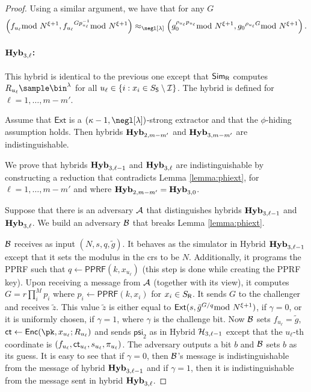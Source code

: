 \begin{proof}
Using a similar argument, we have that 
for any $G$
$$   \left (f_{u_\ell}\smod N^{\xi+1},{f_{u_\ell}}^{ G p_{u_\ell}^{-1}}\smod N^{\xi+1}\right)\approx_{\negl[\lambda]} \left( g_0^{\rho_{u_\ell} p_{u_\ell}}\smod N^{\xi+1},{ g_0}^{\rho_{u_\ell} G}\smod N^{\xi+1}\right).
$$


\paragraph{$\mathsf{\mathbf{Hyb}}_{3,\ell}$:} This hybrid is identical to the previous one except that $\mathsf{Sim}_{\mathsf{R}}$ computes $R_{u_\ell}\sample \bin^\lambda$ for all $u_\ell\in \{i:x_i\in S_{\mathsf{S}}\setminus \mathcal{I} \}$. The hybrid is defined for $\ell=1,\dots, m-m'$.

\begin{claim}
Assume that $\mathsf{Ext}$ is a $(\kappa-1,\negl[\lambda])$-strong extractor and that the $\phi$-hiding assumption holds. Then hybrids $\mathsf{\mathbf{Hyb}}_{2,m-m'}$ and $\mathsf{\mathbf{Hyb}}_{3,m-m'}$ are indistinguishable.
\end{claim}
We prove that hybrids $\mathsf{\mathbf{Hyb}}_{3,\ell-1}$ and $\mathsf{\mathbf{Hyb}}_{3,\ell}$ are indistinguishable by constructing a reduction that contradicts Lemma \ref{lemma:phiext}, for $\ell=1,\dots, m-m'$ and where $\mathsf{\mathbf{Hyb}}_{2,m-m'}=\mathsf{\mathbf{Hyb}}_{3,0}$. 

Suppose that there is an adversary $\mathcal{A}$ that distinguishes hybrids $\mathsf{\mathbf{Hyb}}_{3,\ell-1}$ and $\mathsf{\mathbf{Hyb}}_{3,\ell}$. We build an adversary $\mathcal{B}$ that breaks Lemma \ref{lemma:phiext}. 


$\mathcal{B}$ receives as input $(N,s,q,\tilde g)$. It behaves as the simulator in Hybrid $\mathsf{\mathbf{Hyb}}_{3,\ell-1}$ except that it sets the modulus in the crs to be $N$. Additionally, it programs the PPRF such that $q\leftarrow\mathsf{PPRF}(k,x_{u_\ell})$ (this step is done while creating the PPRF key). Upon receiving a message from $\mathcal{A}$ (together with its view),
 it computes $G=r\prod_i^M p_i$ where $p_i\leftarrow\mathsf{PPRF}(k,x_i)$ for $x_i\in S_{\mathsf{R}}$. It sends $G$ to the challenger and receives $\tilde z$. This value $\tilde z$ is either equal to $\mathsf{Ext}(s,\tilde g^{G/q}\!\!\!\!\mod N^{\xi+1})$, if $\gamma=0$, or it is uniformly chosen, if $\gamma=1$, where $\gamma$ is the challenge bit. Now $\mathcal{B}$ sets $f_{u_\ell}=\tilde g$, $\ct\leftarrow\mathsf{Enc}(\pk,x_{u_\ell};R_{u_\ell})$ and sends $\mathsf{psi}_2$ as in Hybrid $\mathcal{H}_{3,\ell-1}$ except that the $u_\ell$-th coordinate is $(f_{u_\ell},\mathsf{ct}_{u_\ell},s_{u_\ell},\pi_{u_\ell})$. The adversary outputs a bit $b$ and $\mathcal{B}$ sets $b$ as its guess. It is easy to see that if $\gamma=0$, then $\mathcal{B}$'s message is indistinguishable from the message of hybrid $\mathsf{\mathbf{Hyb}}_{3,\ell-1}$ and if $\gamma=1$, then it is indistinguishable from the message sent in hybrid $\mathsf{\mathbf{Hyb}}_{3,\ell}$. 



\end{proof}
